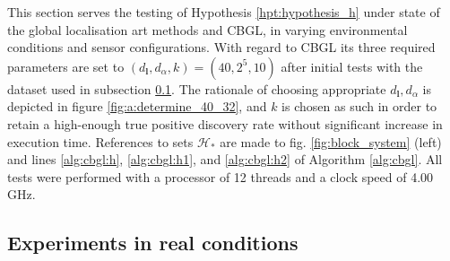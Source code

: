 This section serves the testing of Hypothesis \ref{hpt:hypothesis_h} under
state of the global localisation art methods and CBGL, in varying environmental
conditions and sensor configurations. With regard to CBGL its three required
parameters are set to $(d_{\bm{l}},d_{\alpha},k) = (40, 2^5, 10)$ after
initial tests with the dataset used in subsection \ref{subsec:exp_a}.
The rationale of choosing appropriate $d_{\bm{l}},d_{\alpha}$ is depicted in
figure \ref{fig:a:determine_40_32}, and $k$ is chosen as such in order to
retain a high-enough true positive discovery rate without significant increase
in execution time.
References to sets $\mathcal{H}_{\ast}$ are made to fig. \ref{fig:block_system}
(left) and lines \ref{alg:cbgl:h}, \ref{alg:cbgl:h1}, and \ref{alg:cbgl:h2} of
Algorithm \ref{alg:cbgl}. All tests were performed with a processor of 12
threads and a clock speed of 4.00 GHz.


\subsection{Experiments in real conditions}
\label{subsec:exp_a}

